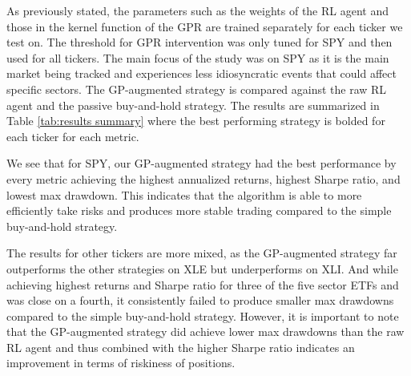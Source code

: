\documentclass[12pt]{article}
\begin{document}
As previously stated, the parameters such as the weights of the RL agent and those in the kernel function of the GPR are trained separately for each ticker we test on. The threshold for GPR intervention was only tuned for SPY and then used for all tickers. The main focus of the study was on SPY as it is the main market being tracked and experiences less idiosyncratic events that could affect specific sectors. The GP-augmented strategy is compared against the raw RL agent and the passive buy-and-hold strategy. The results are summarized in Table \ref{tab:results summary} where the best performing strategy is bolded for each ticker for each metric.

We see that for SPY, our GP-augmented strategy had the best performance by every metric achieving the highest annualized returns, highest Sharpe ratio, and lowest max drawdown. This indicates that the algorithm is able to more efficiently take risks and produces more stable trading compared to the simple buy-and-hold strategy.

The results for other tickers are more mixed, as the GP-augmented strategy far outperforms the other strategies on XLE but underperforms on XLI. And while achieving highest returns and Sharpe ratio for three of the five sector ETFs and was close on a fourth, it consistently failed to produce smaller max drawdowns compared to the simple buy-and-hold strategy. However, it is important to note that the GP-augmented strategy did achieve lower max drawdowns than the raw RL agent and thus combined with the higher Sharpe ratio indicates an improvement in terms of riskiness of positions.
\end{document}
